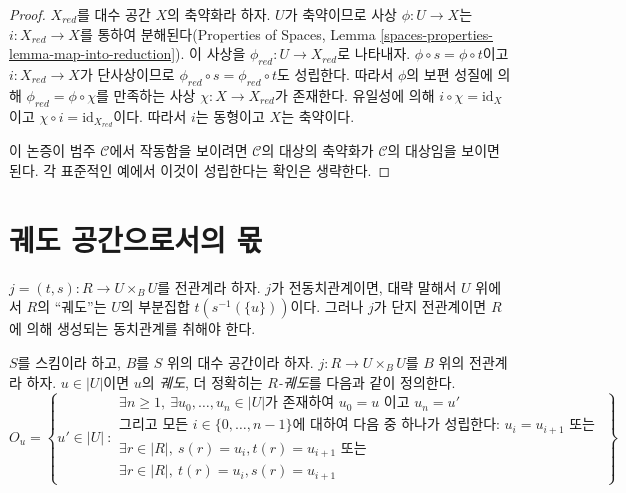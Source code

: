\begin{proof}
$X_{red}$를 대수 공간 $X$의 축약화라 하자.
$U$가 축약이므로 사상 $\phi : U \to X$는
$i : X_{red} \to X$를 통하여 분해된다(Properties of Spaces, Lemma
\ref{spaces-properties-lemma-map-into-reduction}). 이 사상을
$\phi_{red} : U \to X_{red}$로 나타내자. $\phi \circ s = \phi \circ t$이고
$i : X_{red} \to X$가 단사상이므로
$\phi_{red} \circ s = \phi_{red} \circ t$도 성립한다. 따라서
$\phi$의 보편 성질에 의해
$\phi_{red} = \phi \circ \chi$를 만족하는 사상
$\chi : X \to X_{red}$가 존재한다. 유일성에 의해
$i \circ \chi = \text{id}_X$이고 $\chi \circ i = \text{id}_{X_{red}}$이다.
따라서 $i$는 동형이고 $X$는 축약이다.

\medskip\noindent
이 논증이 범주 $\mathcal{C}$에서 작동함을 보이려면
$\mathcal{C}$의 대상의 축약화가 $\mathcal{C}$의 대상임을 보이면 된다.
각 표준적인 예에서 이것이 성립한다는 확인은 생략한다.
\end{proof}





\section{궤도 공간으로서의 몫}
\label{section-orbits}

\noindent
$j = (t, s) : R \to U \times_B U$를 전관계라 하자.
$j$가 전동치관계이면, 대략 말해서 $U$ 위에서 $R$의 “궤도”는
$U$의 부분집합 $t(s^{-1}(\{u\}))$이다. 그러나 $j$가 단지
전관계이면 $R$에 의해 생성되는 동치관계를 취해야 한다.

\begin{definition}
\label{definition-orbit}
$S$를 스킴이라 하고, $B$를 $S$ 위의 대수 공간이라 하자.
$j : R \to U \times_B U$를 $B$ 위의 전관계라 하자.
$u \in |U|$이면 $u$의 {\it 궤도}, 더 정확히는
{\it $R$-궤도}를 다음과 같이 정의한다.
$$
O_u =
\left\{
u' \in |U|\ :
\begin{matrix}
\exists n \geq 1, \ \exists u_0, \ldots, u_n \in |U|\text{가 존재하여 }
u_0 = u \text{ 이고 } u_n = u' \\
\text{그리고 모든 }i \in \{0, \ldots, n - 1\}\text{에 대하여 다음 중 하나가 성립한다: }
u_i = u_{i + 1}\text{ 또는 } \\
\exists r \in |R|, \ s(r) = u_i, t(r) = u_{i + 1}
\text{ 또는 } \\
\exists r \in |R|, \ t(r) = u_i, s(r) = u_{i + 1}
\end{matrix}
\right\}
$$
\end{definition}

